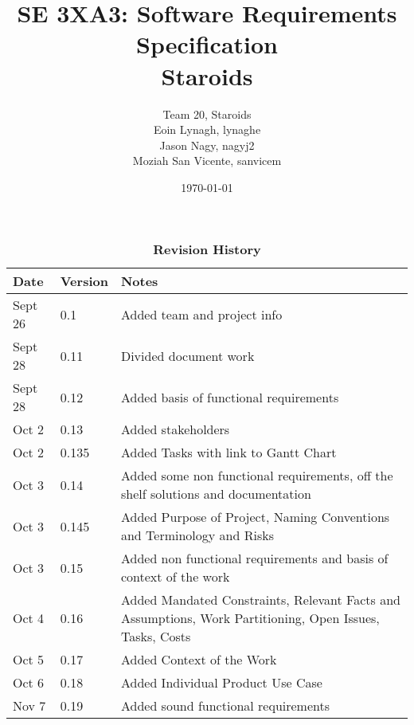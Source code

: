 \documentclass[12pt, titlepage]{article}
\title{SE 3XA3: Software Requirements Specification\\Staroids}
\author{Team 20, Staroids
		\\ Eoin Lynagh, lynaghe
		\\ Jason Nagy, nagyj2
		\\ Moziah San Vicente, sanvicem
}
\date{\today}
\begin{document}
\maketitle

\tableofcontents
\listoftables

\begin{table}[bp]
\caption{\bf Revision History}
\begin{tabularx}{\textwidth}{p{3cm}p{2cm}X}
\toprule {\bf Date} & {\bf Version} & {\bf Notes}\\
\midrule
Sept 26 & 0.1 & Added team and project info\\
Sept 28 & 0.11 & Divided document work\\
Sept 28 & 0.12 & Added basis of functional requirements\\
Oct 2 & 0.13 & Added stakeholders\\
Oct 2 & 0.135 & Added Tasks with link to Gantt Chart\\
Oct 3 & 0.14 & Added some non functional requirements, off the shelf solutions and documentation\\
Oct 3 & 0.145 & Added Purpose of Project, Naming Conventions and Terminology and Risks\\
Oct 3 & 0.15 & Added non functional requirements and basis of context of the work\\
Oct 4 & 0.16 & Added Mandated Constraints, Relevant Facts and Assumptions, Work Partitioning, Open Issues, Tasks, Costs\\
Oct 5 & 0.17 & Added Context of the Work\\
Oct 6 & 0.18 & Added Individual Product Use Case\\
Nov 7 & 0.19 & Added sound functional requirements\\
\bottomrule
\end{tabularx}
\end{table}

\newpage




\end{document}
